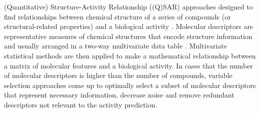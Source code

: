 (Quantitative) Structure-Activity Relationship ((Q)SAR) approaches designed to find relationships between chemical structure of a series of compounds (or structural-related properties) and a biological activity \cite{1995}. Molecular descriptors are representative measures of chemical structures that encode structure information and usually arranged in a two-way multivariate data table \cite{Consonni_2009}. Multivariate statistical methods are then applied to make a mathematical relationship between a matrix of molecular features and a biological activity. In cases that the number of molecular descriptors is higher than the number of compounds, variable selection approaches come up to optimally select a subset of molecular descriptors that represent necessary information, decrease noise and remove redundant descriptors not relevant to the activity prediction.
